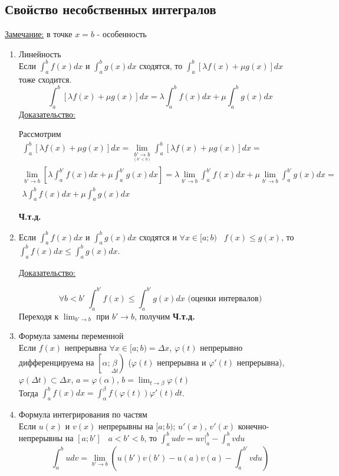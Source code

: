 \documentclass[12pt]{article}
\begin{document}
    \subsection{Свойство несобственных интегралов}\noindent
    \underline{Замечание:} в точке $x=b$ - особенность
    \begin{enumerate}
        \item Линейность\\
        Если $\int_{a}^{b}f(x)dx$ и $\int_{a}^{b} g(x)dx$ сходятся, то $\int_{a}^{b} [\lambda f(x)+\mu g(x)]dx$ тоже сходится.
        \[ \int_{a}^{b}[\lambda f(x)+\mu g(x)]dx=\lambda \int_{a}^{b} f(x)dx + \mu \int_{a}^{b}g(x)dx \]\noindent
        \underline{Доказательство:}
        \begin{adjustwidth}{1.5em}{1.5em}
            Рассмотрим 
            \begin{gather*}
                \int_{a}^{b}[\lambda f(x)+\mu g(x)]dx=\lim_{\underset{(b' < b)}{b' \to b}} \int_{a}^{b}\left[\lambda f(x)+\mu g(x)\right]dx= \\ \lim_{b' \to b}\left[\lambda \int_{a}^{b'}f(x)dx+\mu \int_{a}^{b'}g(x)dx\right]=
                \lambda\lim_{b' \to b} \int_{a}^{b'}f(x)dx+\mu\lim_{b' \to b}\int_{a}^{b'}g(x)dx=\\ \lambda \int_{a}^{b}f(x)dx+\mu \int_{a}^{b}g(x)dx
            \end{gather*}
            \begin{center}
                \textbf{Ч.т.д.}
            \end{center}
        \end{adjustwidth}
        \item Если $\int_{a}^{b} f(x)dx$ и $\int_{a}^{b} g(x)dx$ сходятся и $\forall x \in [a;b) \;\;\; f(x) \leq g(x)$, то $\int_{a}^{b}f(x)dx \leq \int_{a}^{b}g(x)dx$.\par\noindent
        \underline{Доказательство:}
        \begin{adjustwidth}{1.5em}{1.5em}
            \[ \forall b<b' \; \int_{a}^{b'} f(x) \leq \int_{a}^{b'} g(x)dx \text{ (оценки интервалов)}\]
            Переходя к $\lim_{b' \to b}$ при $b' \to b$, получим \textbf{Ч.т.д.}
        \end{adjustwidth}
        \item Формула замены переменной\\
        Если $f(x)$ непрерывна $\forall x \in [a;b) = \Delta x$, $\varphi(t)$ непрерывно дифференцируема на $\left[\alpha;\underset{\Delta t}{\beta}\right)$ ($\varphi(t)$ непрерывна и $\varphi'(t)$ непрерывна), $\varphi(\Delta t) \subset \Delta x$, $a=\varphi(\alpha)$, $b=\lim_{t \to \beta}\varphi(t)$\\
        Тогда $\int_{a}^{b}f(x)dx=\int_{\alpha}^{\beta} f(\varphi(t))\varphi'(t)dt$.
        \item Формула интегрирования по частям\\
        Если $u(x)$ и $v(x)$ непрерывны на $[a;b)$; $u'(x)$, $v'(x)$ конечно-непрерывны на $[a;b'] \;\;\; a<b'<b$, то $\int_{a}^{b}udv=uv\Big|^b_a - \int_{a}^{b}vdu$
        \[ \int_{a}^{b}udv=\lim_{b' \to b} \left(u(b')v(b')-u(a)v(a)-\int_{a}^{b'}vdu\right) \]
    \end{enumerate}
\end{document}
